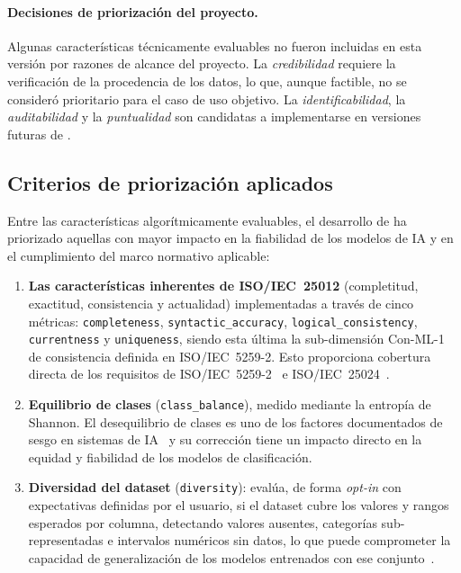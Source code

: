 \paragraph{Decisiones de priorización del proyecto.}
Algunas características técnicamente evaluables no fueron incluidas en
esta versión por razones de alcance del proyecto.  La \emph{credibilidad}
requiere la verificación de la procedencia de los datos, lo que, aunque
factible, no se consideró prioritario para el caso de uso objetivo.  La
\emph{identificabilidad}, la \emph{auditabilidad} y la \emph{puntualidad}
son candidatas a implementarse en versiones futuras de \dataqual.

\subsection{Criterios de priorización aplicados}
\label{sec:priorizacion-mvp}

Entre las características algorítmicamente evaluables, el desarrollo de
\dataqual ha priorizado aquellas con mayor impacto en la fiabilidad de los
modelos de \ac{IA} y en el cumplimiento del marco normativo aplicable:

\begin{enumerate}
  \item \textbf{Las características inherentes de \ac{ISO}/\ac{IEC}~25012}
    (completitud, exactitud, consistencia y actualidad) implementadas a
    través de cinco métricas: \texttt{completeness},
    \texttt{syntactic\_accuracy}, \texttt{logical\_consistency},
    \texttt{currentness} y \texttt{uniqueness}, siendo esta última la
    sub-dimensión Con-ML-1 de consistencia definida en
    \ac{ISO}/\ac{IEC}~5259-2.  Esto proporciona cobertura directa de los
    requisitos de \ac{ISO}/\ac{IEC}~5259-2~\citep{iso5259} e
    \ac{ISO}/\ac{IEC}~25024~\citep{iso25024}.

  \item \textbf{Equilibrio de clases} (\texttt{class\_balance}), medido
    mediante la entropía de Shannon.  El desequilibrio de clases es uno de
    los factores documentados de sesgo en sistemas de
    \ac{IA}~\citep{amazon2018, buolamwini2018} y su corrección tiene un
    impacto directo en la equidad y fiabilidad de los modelos de
    clasificación.

  \item \textbf{Diversidad del dataset} (\texttt{diversity}): evalúa, de
    forma \emph{opt-in} con expectativas definidas por el usuario, si el
    dataset cubre los valores y rangos esperados por columna, detectando
    valores ausentes, categorías sub-representadas e intervalos numéricos
    sin datos, lo que puede comprometer la capacidad de generalización de
    los modelos entrenados con ese conjunto~\citep{iso5259}.
\end{enumerate}

